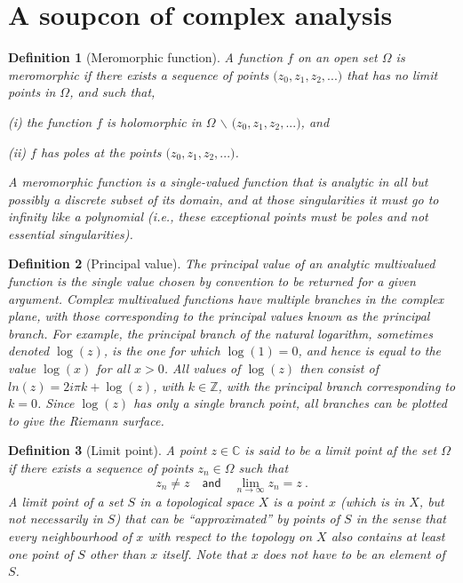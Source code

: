 \documentclass[10pt]{book}
\newcommand{\Cbb}{\mathbb{C}}
\newcommand{\Zbb}{\mathbb{Z}}
\theoremstyle{break}
\newtheorem{definition}{Definition}
\begin{document}
\section{A soupcon of complex analysis}


\begin{definition}[Meromorphic function]
 A function $f$ on an open set $\Omega$ is meromorphic if there exists a sequence of points $\big( z_0 , z_1 , z_2 , . . .\big)$ that has no limit points in $\Omega$, and such that,
 \begin{description}
  \item (i) the function $f$ is holomorphic in $\Omega$ $\backslash$ $\big(z_0 , z_1 , z_2 , . . .\big)$, and
  \item (ii) $f$ has poles at the points $\big(z_0 , z_1 , z_2 , . . .\big)$.
 \end{description} 
 A meromorphic function is a single-valued function that is analytic in all but possibly a discrete subset of its domain, and at those singularities it must go to infinity like a polynomial (i.e., these exceptional points must be poles and not essential singularities). 
\end{definition}

\begin{definition}[Principal value]
 The principal value of an analytic multivalued function is the single value chosen by convention to be returned for a given argument. Complex multivalued functions have multiple branches in the complex plane, with those corresponding to the principal values known as the principal branch. For example, the principal branch of the natural logarithm, sometimes denoted $\log(z)$, is the one for which $\log(1)=0$, and hence is equal to the value $\log(x)$ for all $x>0$. All values of $\log(z)$ then consist of $ln(z) = 2 i \pi k + \log(z)$, with $k \in \Zbb$, with the principal branch corresponding to $k=0$. Since $\log(z)$ has only a single branch point, all branches can be plotted to give the Riemann surface.  
\end{definition}

\begin{definition}[Limit point]
 A point $z\in \Cbb$ is said to be a limit point af the set $\Omega$ if there exists a sequence of points $z_n \in \Omega$ such that 
 \begin{equation*}
  z_n \neq z \quad \mathsf{and} \quad \lim_{n \to \infty} z_n = z \ . 
 \end{equation*}
 A limit point of a set $S$ in a topological space $X$ is a point $x$ (which is in $X$, but not necessarily in $S$) that can be ``approximated'' by points of $S$ in the sense that every neighbourhood of $x$ with respect to the topology on $X$ also contains at least one point of $S$ other than $x$ itself. Note that $x$ does not have to be an element of $S$.  
\end{definition}
\end{document}
